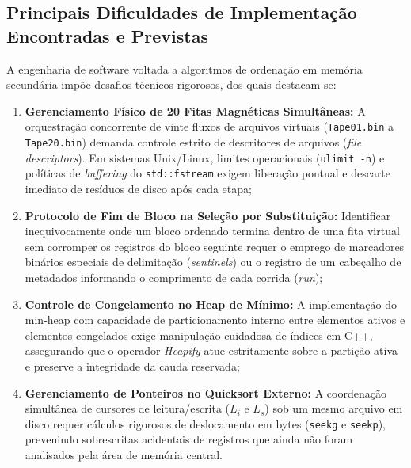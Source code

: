 \documentclass[12pt,a4paper]{article}
\begin{document}
\subsection{Principais Dificuldades de Implementação Encontradas e Previstas}
A engenharia de software voltada a algoritmos de ordenação em memória secundária impõe desafios técnicos rigorosos, dos quais destacam-se:
\begin{enumerate}
    \item \textbf{Gerenciamento Físico de 20 Fitas Magnéticas Simultâneas:} A orquestração concorrente de vinte fluxos de arquivos virtuais (\texttt{Tape01.bin} a \texttt{Tape20.bin}) demanda controle estrito de descritores de arquivos (\textit{file descriptors}). Em sistemas Unix/Linux, limites operacionais (\texttt{ulimit -n}) e políticas de \textit{buffering} do \texttt{std::fstream} exigem liberação pontual e descarte imediato de resíduos de disco após cada etapa;
    \item \textbf{Protocolo de Fim de Bloco na Seleção por Substituição:} Identificar inequivocamente onde um bloco ordenado termina dentro de uma fita virtual sem corromper os registros do bloco seguinte requer o emprego de marcadores binários especiais de delimitação (\textit{sentinels}) ou o registro de um cabeçalho de metadados informando o comprimento de cada corrida (\textit{run});
    \item \textbf{Controle de Congelamento no Heap de Mínimo:} A implementação do min-heap com capacidade de particionamento interno entre elementos ativos e elementos congelados exige manipulação cuidadosa de índices em C++, assegurando que o operador \textit{Heapify} atue estritamente sobre a partição ativa e preserve a integridade da cauda reservada;
    \item \textbf{Gerenciamento de Ponteiros no Quicksort Externo:} A coordenação simultânea de cursores de leitura/escrita ($L_i$ e $L_s$) sob um mesmo arquivo em disco requer cálculos rigorosos de deslocamento em bytes (\texttt{seekg} e \texttt{seekp}), prevenindo sobrescritas acidentais de registros que ainda não foram analisados pela área de memória central.
\end{enumerate}
\end{document}
